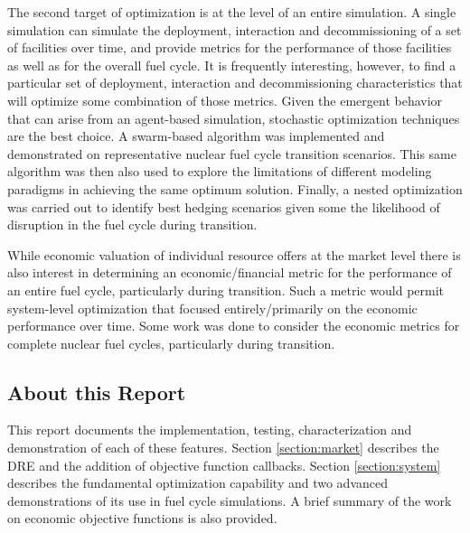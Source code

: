 The second target of optimization is at the level of an entire simulation.  A
single \Cyclus simulation can simulate the deployment, interaction and
decommissioning of a set of facilities over time, and provide metrics for the
performance of those facilities as well as for the overall fuel cycle.  It is
frequently interesting, however, to find a particular set of deployment,
interaction and decommissioning characteristics that will optimize some
combination of those metrics.  Given the emergent behavior that can arise from
an agent-based simulation, stochastic optimization techniques are the best
choice.  A swarm-based algorithm was implemented and demonstrated on
representative nuclear fuel cycle transition scenarios.  This same algorithm
was then also used to explore the limitations of different modeling paradigms
in achieving the same optimum solution.  Finally, a nested optimization was
carried out to identify best hedging scenarios given some the likelihood of
disruption in the fuel cycle during transition.

While economic valuation of individual resource offers at the market level
there is also interest in determining an economic/financial metric for the
performance of an entire fuel cycle, particularly during transition.  Such a
metric would permit system-level optimization that focused entirely/primarily
on the economic performance over time.  Some work was done to consider the
economic metrics for complete nuclear fuel cycles, particularly during
transition.

\subsection{About this Report}

This report documents the implementation, testing, characterization and
demonstration of each of these features.  Section \ref{section:market}
describes the \gls{DRE} and the addition of objective function callbacks.
Section \ref{section:system} describes the fundamental optimization capability
and two advanced demonstrations of its use in fuel cycle simulations.  A brief
summary of the work on economic objective functions is also provided.


